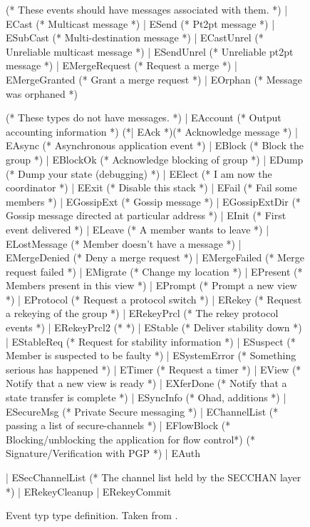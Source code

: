 \begin{figure}
\begin{codebox}

    (* These events should have messages associated with them. *)
  | ECast				(* Multicast message *)
  | ESend				(* Pt2pt message *)
  | ESubCast				(* Multi-destination message *)
  | ECastUnrel				(* Unreliable multicast message *)
  | ESendUnrel				(* Unreliable pt2pt message *)
  | EMergeRequest			(* Request a merge *)
  | EMergeGranted			(* Grant a merge request *)
  | EOrphan				(* Message was orphaned *)

    (* These types do not have messages. *)
  | EAccount				(* Output accounting information *)
(*| EAck			      *)(* Acknowledge message *)
  | EAsync				(* Asynchronous application event *)
  | EBlock				(* Block the group *)
  | EBlockOk				(* Acknowledge blocking of group *)
  | EDump				(* Dump your state (debugging) *)
  | EElect				(* I am now the coordinator *)
  | EExit				(* Disable this stack *)
  | EFail				(* Fail some members *)
  | EGossipExt				(* Gossip message *)
  | EGossipExtDir			(* Gossip message directed at particular address *)
  | EInit				(* First event delivered *)
  | ELeave				(* A member wants to leave *)
  | ELostMessage			(* Member doesn't have a message *)
  | EMergeDenied			(* Deny a merge request *)
  | EMergeFailed			(* Merge request failed *)
  | EMigrate				(* Change my location *)
  | EPresent                            (* Members present in this view *)
  | EPrompt				(* Prompt a new view *)
  | EProtocol				(* Request a protocol switch *)
  | ERekey				(* Request a rekeying of the group *)
  | ERekeyPrcl				(* The rekey protocol events *)
  | ERekeyPrcl2				(*                           *)
  | EStable				(* Deliver stability down *)
  | EStableReq				(* Request for stability information *)
  | ESuspect				(* Member is suspected to be faulty *)
  | ESystemError			(* Something serious has happened *)
  | ETimer				(* Request a timer *)
  | EView				(* Notify that a new view is ready *)
  | EXferDone				(* Notify that a state transfer is complete *)
  | ESyncInfo
      (* Ohad, additions *)
  | ESecureMsg				(* Private Secure messaging *)
  | EChannelList			(* passing a list of secure-channels *)
  | EFlowBlock				(* Blocking/unblocking the application for flow control*)
(* Signature/Verification with PGP *)
  | EAuth

  | ESecChannelList                     (* The channel list held by the SECCHAN layer *)
  | ERekeyCleanup
  | ERekeyCommit 
\end{codebox}
\caption{Event typ type definition.  Taken from .}
\label{fig:enum}
\end{figure}

